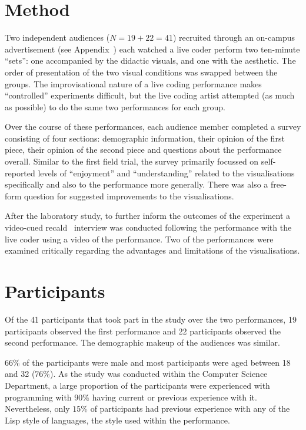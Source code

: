 \section{Method}

Two independent audiences ($N=19+22=41$) recruited through an on-campus advertisement (see Appendix~) each watched a live coder perform two ten-minute ``sets'': one accompanied by the didactic visuals, and one with the aesthetic. The order of presentation of the two visual conditions was swapped between the groups. The improvisational nature of a live coding performance makes ``controlled'' experiments difficult, but the live coding artist attempted (as much as possible) to do the same two performances for each group.

Over the course of these performances, each audience member completed a survey consisting of four sections: demographic information, their opinion of the first piece, their opinion of the second piece and questions about the performance overall. Similar to the first field trial, the survey primarily focussed on self-reported levels of ``enjoyment'' and ``understanding'' related to the visualisations specifically and also to the performance more generally. There was also a free-form question for suggested improvements to the visualisations.

After the laboratory study, to further inform the outcomes of the experiment a video-cued recald~\cite{Suchman1992} interview was conducted following the performance with the live coder using a video of the performance. Two of the performances were examined critically regarding the advantages and limitations of the visualisations.

\section{Participants}

Of the 41 participants that took part in the study over the two performances, 19 participants observed the first performance and 22 participants observed the second performance. The demographic makeup of the audiences was similar.

$66\%$ of the participants were male and most participants were aged between 18 and 32 ($76\%$). As the study was conducted within the Computer Science Department, a large proportion of the participants were experienced with programming with $90\%$ having current or previous experience with it. Nevertheless, only $15\%$ of participants had previous experience with any of the Lisp style of languages, the style used within the performance.

